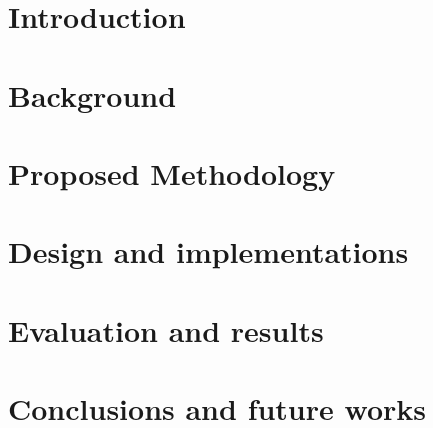 \documentclass[
12pt, %
oneside, %
english, %
onehalfspacing,
liststotoc, %
headsepline, %
]{MastersDoctoralThesis} %
\begin{document}
\lstlistoflistings %


\mainmatter %

\pagestyle{thesis} %

%

\chapter{Introduction}
\label{cap:introduzione}


\chapter{Background}
\label{cap:stato_dellarte}


\chapter{Proposed Methodology}
\label{cap:metodologia}


\chapter{Design and implementations}
\label{cap:progettazione}


\chapter{Evaluation and results}
\label{cap:sperimentazione}


\chapter{Conclusions and future works}
\label{cap:conclusioni}

\end{document}

